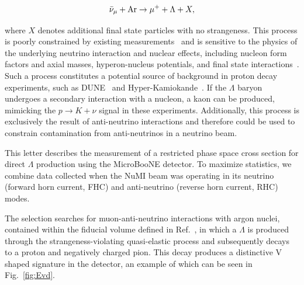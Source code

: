 \documentclass[aps,prl,twocolumn,superscriptaddress]{revtex4}
\begin{document}
\begin{align}
\Bar{\nu}_{\mu} + \textrm{Ar} \to \mu^+ + \Lambda + X,
\end{align}

\noindent where $X$ denotes additional final state particles with no strangeness. This process is poorly constrained by existing measurements~\cite{Ammosov:1986jn,Eichten:1972bb,Erriquez1,Erriquez2,Brunner:1989kw,Fanourakis:1980} and is sensitive to the physics of the underlying neutrino interaction and nuclear effects, including nucleon form factors and axial masses, hyperon-nucleus potentials, and final state interactions~\cite{Thorpe:2020tym,Sobczyk:2019uej,Singh:2006xp}. Such a process constitutes a potential source of background in proton decay experiments, such as DUNE~\cite{DUNE:2020fgq,DUNE:2020ypp} and Hyper-Kamiokande~\cite{Hyper-Kamiokande:2018ofw}. If the $\Lambda$ baryon undergoes a secondary interaction with a nucleon, a kaon can be produced, mimicking the $p \to K + \nu$ signal in these experiments.  Additionally, this process is exclusively the result of anti-neutrino interactions and therefore could be used to constrain contamination from anti-neutrinos in a neutrino beam.

This letter describes the measurement of a restricted phase space cross section for direct $\Lambda$ production using the MicroBooNE detector. To maximize statistics, we combine data collected when the NuMI beam was operating in its neutrino (forward horn current, FHC) and anti-neutrino (reverse horn current, RHC) modes.


The selection searches for muon-anti-neutrino interactions with argon nuclei, contained within the fiducial volume defined in Ref.~\cite{MicroBooNE:2021zul}, in which a $\Lambda$ is produced through the strangeness-violating quasi-elastic process and subsequently decays to a proton and negatively charged pion. This decay produces a distinctive V shaped signature in the detector, an example of which can be seen in Fig.~\ref{fig:Evd}.

\end{document}
